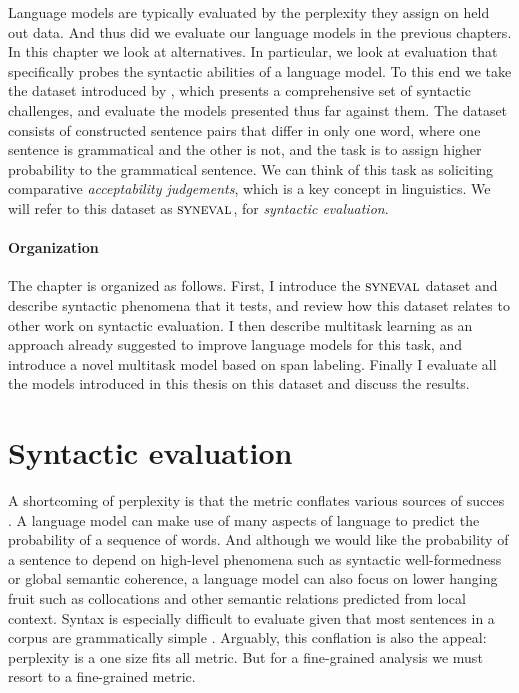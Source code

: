 % 

Language models are typically evaluated by the perplexity they assign on held out data. And thus did we evaluate our language models in the previous chapters. In this chapter we look at alternatives. In particular, we look at evaluation that specifically probes the syntactic abilities of a language model. To this end we take the dataset introduced by \citet{linzen2018targeted}, which presents a comprehensive set of syntactic challenges, and evaluate the models presented thus far against them. The dataset consists of constructed sentence pairs that differ in only one word, where one sentence is grammatical and the other is not, and the task is to assign higher probability to the grammatical sentence. We can think of this task as soliciting comparative \textit{acceptability judgements}, which is a key concept in linguistics. We will refer to this dataset as $\textsc{syneval}$, for \textit{syntactic evaluation}.

\paragraph{Organization}
The chapter is organized as follows. First, I introduce the $\textsc{syneval}$ dataset and describe syntactic phenomena that it tests, and review how this dataset relates to other work on syntactic evaluation. I then describe multitask learning as an approach already suggested to improve language models for this task, and introduce a novel multitask model based on span labeling. Finally I evaluate all the models introduced in this thesis on this dataset and discuss the results.

\section{Syntactic evaluation}
A shortcoming of perplexity is that the metric conflates various sources of succes \citep{linzen2018targeted}. A language model can make use of many aspects of language to predict the probability of a sequence of words. And although we would like the probability of a sentence to depend on high-level phenomena such as syntactic well-formedness or global semantic coherence, a language model can also focus on lower hanging fruit such as collocations and other semantic relations predicted from local context. Syntax is especially difficult to evaluate given that most sentences in a corpus are grammatically simple \citep{linzen2018targeted}. Arguably, this conflation is also the appeal: perplexity is a one size fits all metric. But for a fine-grained analysis we must resort to a fine-grained metric.

